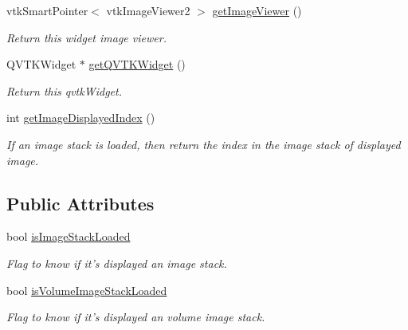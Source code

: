 \begin{DoxyCompactItemize}
vtk\-Smart\-Pointer$<$ vtk\-Image\-Viewer2 $>$ \hyperlink{class_q_v_t_k_image_widget_aaa03d39486c547c29d54127cf936c884}{get\-Image\-Viewer} ()
\begin{DoxyCompactList}\small\item\em Return this widget image viewer. \end{DoxyCompactList}\item 
Q\-V\-T\-K\-Widget $\ast$ \hyperlink{class_q_v_t_k_image_widget_a41d916b555961f04dbdb571d8263c515}{get\-Q\-V\-T\-K\-Widget} ()
\begin{DoxyCompactList}\small\item\em Return this qvtk\-Widget. \end{DoxyCompactList}\item 
int \hyperlink{class_q_v_t_k_image_widget_ae41186ba6e99598e4ad4380f7d7ef638}{get\-Image\-Displayed\-Index} ()
\begin{DoxyCompactList}\small\item\em If an image stack is loaded, then return the index in the image stack of displayed image. \end{DoxyCompactList}\end{DoxyCompactItemize}
\subsection*{Public Attributes}
\begin{DoxyCompactItemize}
\item 
bool \hyperlink{class_q_v_t_k_image_widget_ac1af73fa525569f5ec5d581561b379a3}{is\-Image\-Stack\-Loaded}
\begin{DoxyCompactList}\small\item\em Flag to know if it's displayed an image stack. \end{DoxyCompactList}\item 
bool \hyperlink{class_q_v_t_k_image_widget_a9d3b5fe40f1135532c480fdb2ca9239d}{is\-Volume\-Image\-Stack\-Loaded}
\begin{DoxyCompactList}\small\item\em Flag to know if it's displayed an volume image stack. \end{DoxyCompactList}\end{DoxyCompactItemize}
